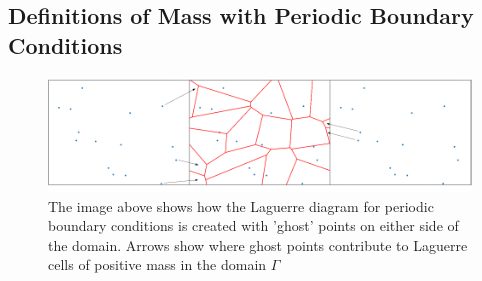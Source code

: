 \subsection{Definitions of Mass with Periodic Boundary Conditions}
\begin{figure}[h]
	\centering
	\includegraphics[width=1\linewidth]{project/laguerre_diagram_OTPw_periodic}
	\caption[Periodic boundary conditions with 'ghost' points]{The image above shows how the Laguerre diagram for periodic boundary conditions is created with 'ghost' points on either side of the domain. Arrows show where ghost points contribute to Laguerre cells of positive mass in the domain $\Gamma$}
\end{figure}


